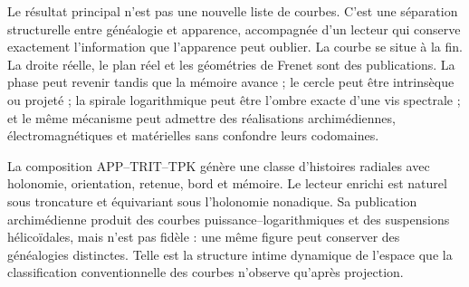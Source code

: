 Le résultat principal n'est pas une nouvelle liste de courbes. C'est une séparation structurelle entre généalogie et apparence, accompagnée d'un lecteur qui conserve exactement l'information que l'apparence peut oublier. La courbe se situe à la fin. La droite réelle, le plan réel et les géométries de Frenet sont des publications. La phase peut revenir tandis que la mémoire avance ; le cercle peut être intrinsèque ou projeté ; la spirale logarithmique peut être l'ombre exacte d'une vis spectrale ; et le même mécanisme peut admettre des réalisations archimédiennes, électromagnétiques et matérielles sans confondre leurs codomaines.

\begin{resultbox}[title={Classification fonctorielle du lecteur radial et stratification de ses réalisations}]
La composition APP--TRIT--TPK génère une classe d'histoires radiales avec holonomie, orientation, retenue, bord et mémoire. Le lecteur enrichi est naturel sous troncature et équivariant sous l'holonomie nonadique. Sa publication archimédienne produit des courbes puissance--logarithmiques et des suspensions hélicoïdales, mais n'est pas fidèle : une même figure peut conserver des généalogies distinctes. Telle est la structure intime dynamique de l'espace que la classification conventionnelle des courbes n'observe qu'après projection.
\end{resultbox}
